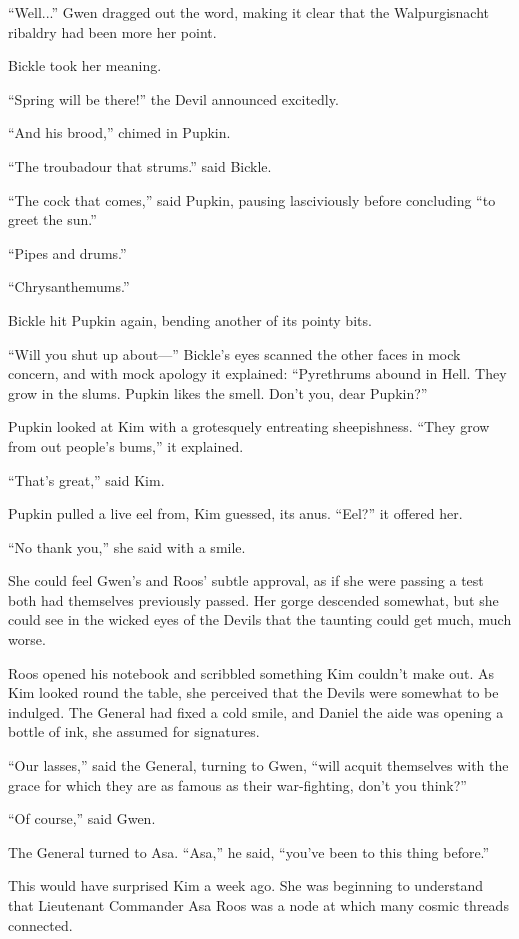 \documentclass[11pt,a5paper]{article}
\begin{document}
``Well...'' Gwen dragged out the word, making it clear that the Walpurgisnacht ribaldry had been more her point.

Bickle took her meaning.

``Spring will be there!'' the Devil announced excitedly.

``And his brood,'' chimed in Pupkin.

``The troubadour that strums.'' said Bickle.

``The cock that comes,'' said Pupkin, pausing lasciviously before concluding ``to greet the sun.''

``Pipes and drums.''

``Chrysanthemums.''

Bickle hit Pupkin again, bending another of its pointy bits.

``Will you shut up about---'' Bickle's eyes scanned the other faces in mock concern, and with mock apology it explained: ``Pyrethrums abound in Hell. They grow in the slums. Pupkin likes the smell. Don't you, dear Pupkin?''

Pupkin looked at Kim with a grotesquely entreating sheepishness. ``They grow from out people's bums,'' it explained.

``That's great,'' said Kim.

Pupkin pulled a live eel from, Kim guessed, its anus. ``Eel?'' it offered her.

``No thank you,'' she said with a smile.

She could feel Gwen's and Roos' subtle approval, as if she were passing a test both had themselves previously passed. Her gorge descended somewhat, but she could see in the wicked eyes of the Devils that the taunting could get much, much worse.

Roos opened his notebook and scribbled something Kim couldn't make out. As Kim looked round the table, she perceived that the Devils were somewhat to be indulged. The General had fixed a cold smile, and Daniel the aide was opening a bottle of ink, she assumed for signatures.

``Our lasses,'' said the General, turning to Gwen, ``will acquit themselves with the grace for which they are as famous as their war-fighting, don't you think?''

``Of course,'' said Gwen.

The General turned to Asa. ``Asa,'' he said, ``you've been to this thing before.''

This would have surprised Kim a week ago. She was beginning to understand that Lieutenant Commander Asa Roos was a node at which many cosmic threads connected.
\end{document}
